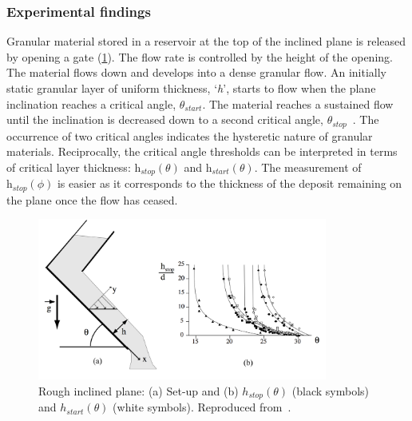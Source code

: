 \subsubsection{Experimental findings}

Granular material stored in a reservoir at the top of the inclined plane is 
released by opening a gate (\cref{fig:Incline}). The flow rate is controlled by 
the height of the opening. The material flows down and develops into a dense 
granular flow. An initially static granular layer of uniform thickness, 
`\textit{h}', starts to flow when the plane inclination reaches a critical 
angle, $\theta_{\textit{start}}$. The material reaches a sustained flow until 
the inclination is decreased down to a second critical angle, 
$\theta_{\textit{stop}}$~\citep{Midi2004}. The occurrence of two critical 
angles indicates the hysteretic nature of granular materials. Reciprocally, the 
critical angle thresholds can be interpreted in terms of critical layer 
thickness: $\textit{h}_{\textit{stop}}(\theta)$ and 
$\textit{h}_{\textit{start}}(\theta)$. The measurement of  
$\textit{h}_{\textit{stop}}(\phi)$ is easier as it corresponds to the thickness 
of the deposit remaining on the plane once the flow has ceased. 

\begin{figure}[tbhp]
\centering
\includegraphics[width=0.85\textwidth]{Incline}
\caption{Rough inclined plane: (a) Set-up and (b) $h_{stop}(\theta)$ (black 
symbols) and $h_{start}(\theta)$ (white symbols). Reproduced 
from~\citep{Midi2004}.}
\label{fig:Incline}
\end{figure}


